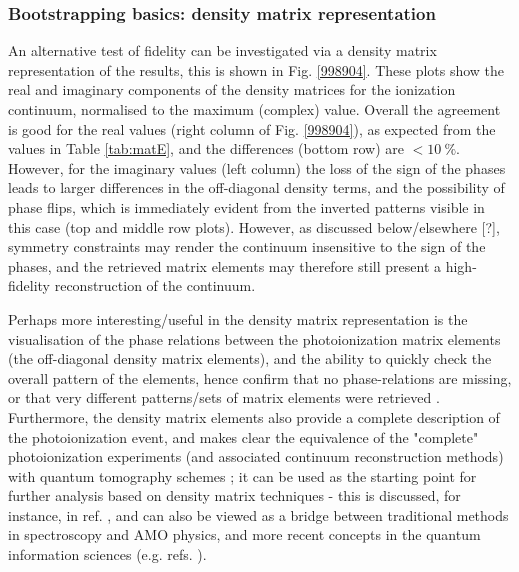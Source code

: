 \subsubsection{Bootstrapping basics: density matrix representation}

An alternative test of fidelity can be investigated via a density matrix representation of the results, this is shown in Fig. \ref{998904}. These plots show the real and imaginary components of the density matrices for the ionization continuum, normalised to the maximum (complex) value. Overall the agreement is good for the real values (right column of Fig. \ref{998904}), as expected from the values in Table \ref{tab:matE}, and the differences (bottom row) are $<10~\%$. However, for the imaginary values (left column) the loss of the sign of the phases leads to larger differences in the off-diagonal density terms, and the possibility of phase flips, which is immediately evident from the inverted patterns visible in this case (top and middle row plots). However, as discussed below/elsewhere [?], symmetry constraints may render the continuum insensitive to the sign of the phases, and the retrieved matrix elements may therefore still present a high-fidelity reconstruction of the continuum.

Perhaps more interesting/useful in the density matrix representation is the visualisation of the phase relations between the photoionization matrix elements (the off-diagonal density matrix elements), and the ability to quickly check the overall pattern of the elements, hence confirm that no phase-relations are missing, or that very different patterns/sets of matrix elements were retrieved . Furthermore, the density matrix elements also provide a complete description of the photoionization event, and makes clear the equivalence of the "complete" photoionization experiments (and associated continuum reconstruction methods) with quantum tomography schemes \cite{MauroDAriano2003}; it can be used as the starting point for further analysis based on density matrix techniques - this is discussed, for instance, in ref. \cite{BlumDensityMat}, and can also be viewed as a bridge between traditional methods in spectroscopy and AMO physics, and more recent concepts in the quantum information sciences (e.g. refs.  \cite{Tichy2011a,Yuen-Zhou2014}).

